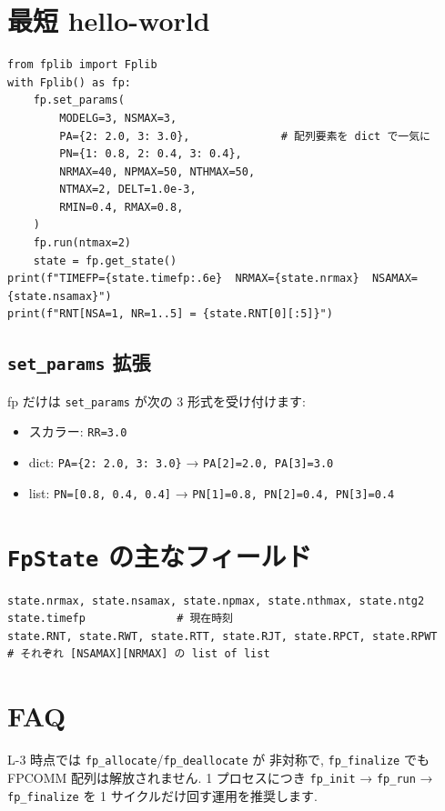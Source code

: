 \documentclass[11pt,a4paper]{report}
\begin{document}
\section{最短 hello-world}

\begin{lstlisting}[style=py,caption={fplib 最短例 — dict 形式の配列指定}]
from fplib import Fplib
with Fplib() as fp:
    fp.set_params(
        MODELG=3, NSMAX=3,
        PA={2: 2.0, 3: 3.0},              # 配列要素を dict で一気に
        PN={1: 0.8, 2: 0.4, 3: 0.4},
        NRMAX=40, NPMAX=50, NTHMAX=50,
        NTMAX=2, DELT=1.0e-3,
        RMIN=0.4, RMAX=0.8,
    )
    fp.run(ntmax=2)
    state = fp.get_state()
print(f"TIMEFP={state.timefp:.6e}  NRMAX={state.nrmax}  NSAMAX={state.nsamax}")
print(f"RNT[NSA=1, NR=1..5] = {state.RNT[0][:5]}")
\end{lstlisting}

\subsection*{\texttt{set\_params} 拡張}

fp だけは \texttt{set\_params} が次の 3 形式を受け付けます:

\begin{itemize}[leftmargin=1.5em]
  \item スカラー: \texttt{RR=3.0}
  \item dict: \texttt{PA=\{2: 2.0, 3: 3.0\}} → \texttt{PA[2]=2.0, PA[3]=3.0}
  \item list: \texttt{PN=[0.8, 0.4, 0.4]} → \texttt{PN[1]=0.8, PN[2]=0.4, PN[3]=0.4}
\end{itemize}

\section{\texttt{FpState} の主なフィールド}

\begin{lstlisting}[style=py]
state.nrmax, state.nsamax, state.npmax, state.nthmax, state.ntg2
state.timefp              # 現在時刻
state.RNT, state.RWT, state.RTT, state.RJT, state.RPCT, state.RPWT
# それぞれ [NSAMAX][NRMAX] の list of list
\end{lstlisting}

\section{FAQ}

\begin{faq}
L-3 時点では \texttt{fp\_allocate}/\texttt{fp\_deallocate} が
非対称で, \texttt{fp\_finalize} でも FPCOMM 配列は解放されません.
1 プロセスにつき \texttt{fp\_init} → \texttt{fp\_run} → \texttt{fp\_finalize}
を 1 サイクルだけ回す運用を推奨します.
\end{faq}
\end{document}
